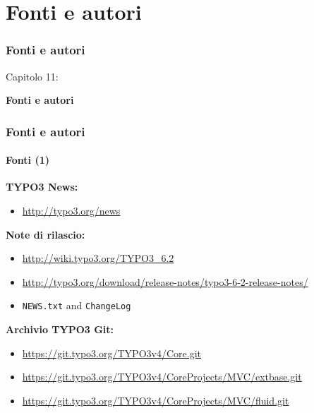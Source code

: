 %

\section{Fonti e autori}
\begin{frame}[fragile]
	\frametitle{Fonti e autori}

	\begin{center}\huge{Capitolo 11:}\end{center}
	\begin{center}\huge{\color{typo3darkgrey}\textbf{Fonti e autori}}\end{center}

\end{frame}


\begin{frame}[fragile]
	\frametitle{Fonti e autori}
	\framesubtitle{Fonti (1)}

	\textbf{TYPO3 News:}
		\begin{itemize}\smaller
			\item \url{http://typo3.org/news}
		\end{itemize}

	\textbf{Note di rilascio:}
		\begin{itemize}\smaller
			\item \url{http://wiki.typo3.org/TYPO3_6.2}
			\item \url{http://typo3.org/download/release-notes/typo3-6-2-release-notes/}
			\item \texttt{NEWS.txt} and \texttt{ChangeLog}
		\end{itemize}

	\textbf{Archivio TYPO3 Git:}
		\begin{itemize}\smaller
			\item \url{https://git.typo3.org/TYPO3v4/Core.git}
			\item \url{https://git.typo3.org/TYPO3v4/CoreProjects/MVC/extbase.git}
			\item \url{https://git.typo3.org/TYPO3v4/CoreProjects/MVC/fluid.git}
		\end{itemize}

\end{frame}

